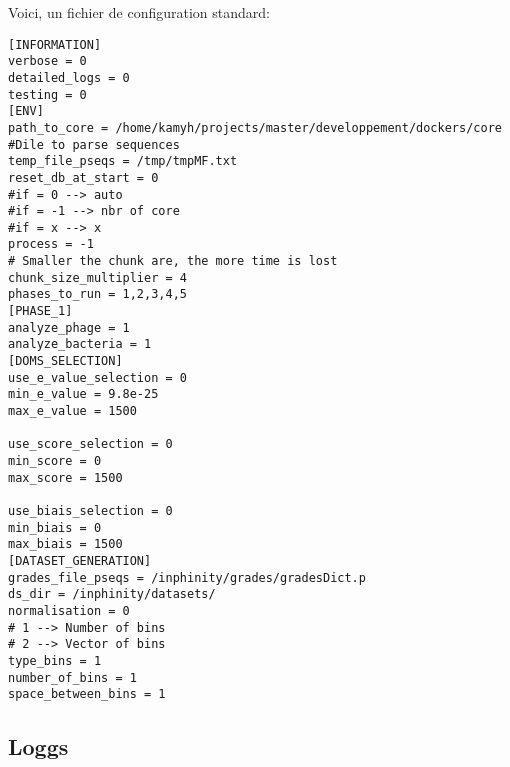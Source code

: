 Voici, un fichier de configuration standard:

\begin{lstlisting}[frame=single]
[INFORMATION]
verbose = 0
detailed_logs = 0
testing = 0
[ENV]
path_to_core = /home/kamyh/projects/master/developpement/dockers/core
#Dile to parse sequences
temp_file_pseqs = /tmp/tmpMF.txt
reset_db_at_start = 0
#if = 0 --> auto
#if = -1 --> nbr of core
#if = x --> x
process = -1
# Smaller the chunk are, the more time is lost
chunk_size_multiplier = 4
phases_to_run = 1,2,3,4,5
[PHASE_1]
analyze_phage = 1
analyze_bacteria = 1
[DOMS_SELECTION]
use_e_value_selection = 0
min_e_value = 9.8e-25
max_e_value = 1500

use_score_selection = 0
min_score = 0
max_score = 1500

use_biais_selection = 0
min_biais = 0
max_biais = 1500
[DATASET_GENERATION]
grades_file_pseqs = /inphinity/grades/gradesDict.p
ds_dir = /inphinity/datasets/
normalisation = 0
# 1 --> Number of bins
# 2 --> Vector of bins
type_bins = 1
number_of_bins = 1
space_between_bins = 1
\end{lstlisting}

\subsection{Loggs}
















